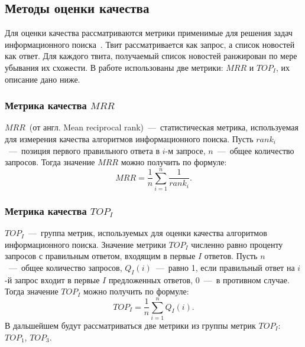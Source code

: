 \subsection{Методы оценки качества}
    Для оценки качества рассматриваются метрики применимые для решения задач информационного поиска~\cite{steck_recommender}.
    Твит рассматривается как запрос, а список новостей как ответ. 
    Для каждого твита, получаемый список новостей ранжирован по мере убывания их схожести.
    В работе использованы две метрики: $MRR$ и $TOP_I$, их описание дано ниже.

    \subsubsection{Метрика качества $MRR$}
    \label{subsubsec:MRR}
        $MRR$~(от англ. Mean reciprocal rank)~---~статистическая метрика, используемая для измерения качества алгоритмов информационного поиска.
        Пусть $rank_i$~---~позиция первого правильного ответа в $i$-м запросе, $n$~---~общее количество запросов.
        Тогда значение $MRR$ можно получить по формуле:
        \begin{equation}
            MRR = \dfrac{1}{n} \sum_{i=1}^n \dfrac{1}{rank_i}.
        \end{equation}

    \subsubsection{Метрика качества $TOP_I$}
        $TOP_I$~---~группа метрик, используемых для оценки качества алгоритмов информационного поиска. Значение метрики $TOP_I$
        численно равно проценту запросов с правильным ответом, входящим в первые $I$ ответов.
        Пусть $n$~---~общее количество запросов, $Q_I(i)$~---~равно 1, если правильный ответ на $i$-й запрос входит в первые $I$ предложенных ответов, 0~---~в противном случае.
        Тогда значение $TOP_I$ можно получить по формуле:
        \begin{equation}
            TOP_I=\dfrac{1} {n} \sum_{i=1}^n Q_I(i).
        \end{equation}
        В дальшейшем будут рассматриваться две метрики из группы метрик $TOP_I$: $TOP_1$, $TOP_3$.


